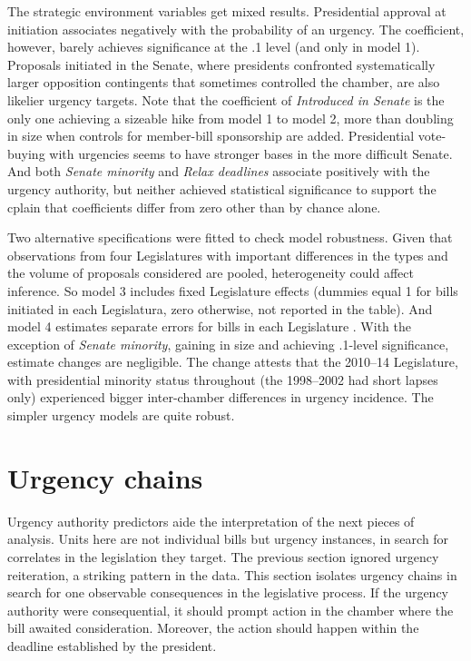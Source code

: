 \documentclass[letter,12pt]{article}
\begin{document}
The strategic environment variables get mixed results. Presidential approval at initiation associates negatively with the probability of an urgency. The coefficient, however, barely achieves significance at the .1 level (and only in model 1). Proposals initiated in the Senate, where presidents confronted systematically larger opposition contingents that sometimes controlled the chamber, are also likelier urgency targets. Note that the coefficient of \emph{Introduced in Senate} is the only one achieving a sizeable hike from model 1 to model 2, more than doubling in size when controls for member-bill sponsorship are added. Presidential vote-buying with urgencies seems to have stronger bases in the more difficult Senate. And both \emph{Senate minority} and \emph{Relax deadlines} associate positively with the urgency authority, but neither achieved statistical significance to support the cplain that coefficients differ from zero other than by chance alone. 

Two alternative specifications were fitted to check model robustness. Given that observations from four Legislatures with important differences in the types and the volume of proposals considered \citep{aleman.navia.UrgChi.2009} are pooled, heterogeneity could affect inference. So model 3 includes fixed Legislature effects (dummies equal 1 for bills initiated in each Legislatura, zero otherwise, not reported in the table). And model 4 estimates separate errors for bills in each Legislature \citep[a so-called mixed effects model,][:262,302]{gelman.hill.2007}. With the exception of \emph{Senate minority}, gaining in size and achieving .1-level significance, estimate changes are negligible. The change attests that the 2010--14 Legislature, with presidential minority status throughout (the 1998--2002 had short lapses only) experienced bigger inter-chamber differences in urgency incidence. The simpler urgency models are quite robust. 

\section{Urgency chains}

Urgency authority predictors aide the interpretation of the next pieces of analysis. Units here are not individual bills but urgency instances, in search for correlates in the legislation they target. The previous section ignored urgency reiteration, a striking pattern in the data. This section isolates urgency chains in search for one observable consequences in the legislative process. If the urgency authority were consequential, it should prompt action in the chamber where the bill awaited consideration. Moreover, the action should happen within the deadline established by the president. 
\end{document}
